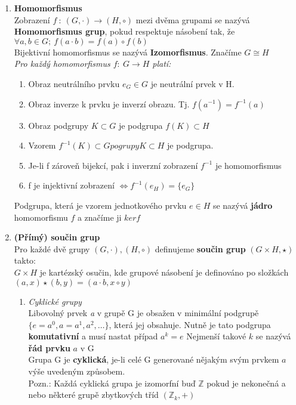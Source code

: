 \documentclass[12pt,a4paper]{article}
\begin{document}
\begin{enumerate}
		\item \textbf{Homomorfismus}\\
		Zobrazení 	$f~:~(G,\cdot) \rightarrow (H,\circ)$ mezi dvěma grupami se nazývá  \textbf{Homomorfismus grup}, pokud respektuje násobení tak, že $\forall a,b \in G;~ f(a\cdot b) = f(a) \circ f(b)$ \\Bijektivní homomorfismus se nazývá \textbf{Izomorfismus}. Značíme $G \cong H$ \\ \textit{Pro každý homomorfismus $f:~G \rightarrow H$ platí:}
		\begin{enumerate}
			\item Obraz neutrálního prvku $e_G \in G$ je neutrální prvek v H.
			\item Obraz inverze k prvku je inverzí obrazu. Tj. $f(a^{-1}) = f^{-1}(a)$
			\item Obraz podgrupy $K \subset G$ je podgrupa $f(K) \subset H$
			\item Vzorem $f^{-1}(K) \subset G pogrupy K \subset H$ je podgrupa.
			\item Je-li f zároveň bijekcí, pak i inverzní zobrazení $f^{-1}$ je homomorfismus
			\item f je injektivní zobrazení $\Leftrightarrow f^{-1}(e_H)= \{e_G\}$
		\end{enumerate}
		Podgrupa, která je vzorem jednotkového prvku $e \in H$ se nazývá \textbf{jádro} homomorfismu $f$ a značíme ji $ker f$
		
		\item \textbf{(Přímý) součin grup}\\
		Pro každé dvě grupy $(G,\cdot), (H,\circ)$ definujeme \textbf{součin grup} $(G \times H, \star)$ takto:\\ $G \times H$ je kartézský osučin, kde grupové násobení je definováno po složkách
		$(a,x) \star (b,y) = (a \cdot b, x \circ y)$
		\begin{enumerate}
			\item \textit{Cyklické grupy} \\
			Libovolný prvek \textit{a} v grupě  G je obsažen v minimální podgrupě\\ $\{e = a^0, a = a^1, a^2, \dots\}$, která jej obsahuje. Nutně je tato podgrupa \textbf{komutativní} a musí nastat případ $a^k = e$
			Nejmenší takové $k$ se nazývá \textbf{řád prvku} $a$ v G\\ Grupa G je \textbf{cyklická}, je-li celé G generované nějakým svým prvkem $a$ výše uvedeným způsobem.\\ 
			Pozn.: Každá cyklická grupa je izomorfní buď $\mathbb{Z}$ pokud je nekonečná a nebo některé grupě zbytkových tříd $(\mathbb{Z}_k,+)$
		\end{enumerate}
			

\end{enumerate}
\end{document}
